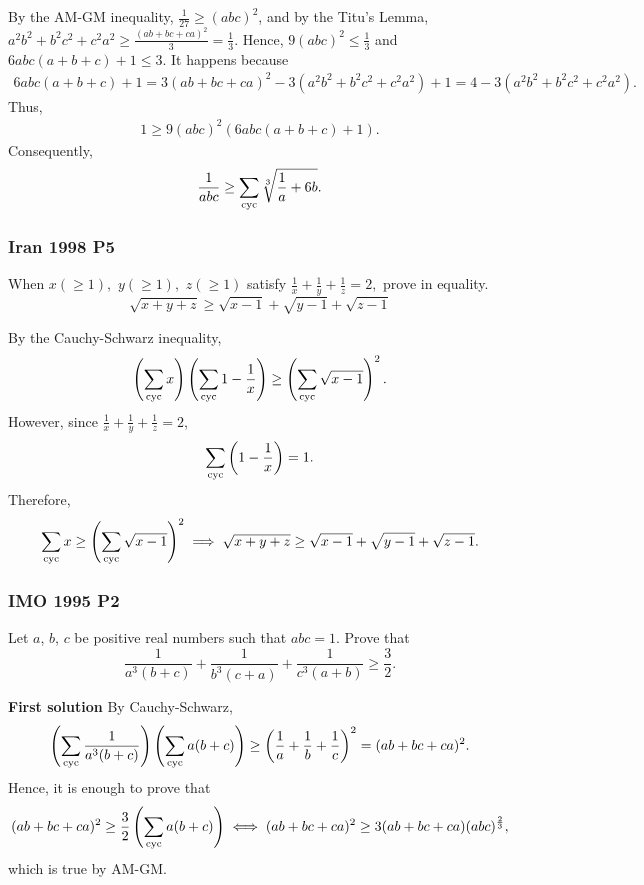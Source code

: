 \documentclass[12pt]{article}
\begin{document}
\clearpage

By the AM-GM inequality, $\frac{1}{27} \ge (abc)^2$, and by the Titu's Lemma, $a^2b^2+b^2c^2+c^2a^2 \ge \frac{(ab+bc+ca)^2}{3} = \frac{1}{3}$.
Hence, $9(abc)^2 \le \frac{1}{3}$ and $6abc(a+b+c)+1 \le 3$. It happens because
\begin{align*}
	6abc(a+b+c)+1 = 3(ab+bc+ca)^2 -3(a^2b^2+b^2c^2+c^2a^2)+1=4-3(a^2b^2+b^2c^2+c^2a^2).
\end{align*}
Thus,
\begin{align*}
	1 \ge 9(abc)^2(6abc(a+b+c)+1).
\end{align*}
Consequently,
\begin{align*}
	\frac{1}{abc} \ge \sum_{\text{cyc}} \sqrt[3]{\frac{1}{a} +6b}.
\end{align*}

\clearpage

\subsubsection{Iran 1998 P5}

\begin{problem}
When $x(\ge1),$ $y(\ge1),$ $z(\ge1)$ satisfy $\frac{1}{x}+\frac{1}{y}+\frac{1}{z}=2,$ prove in equality.
$$\sqrt{x+y+z}\ge\sqrt{x-1}+\sqrt{y-1}+\sqrt{z-1}$$
\end{problem}

By the Cauchy-Schwarz inequality,
\[
	\left(\sum_{\text{cyc}} x\right)\left(\sum_{\text{cyc}} 1-\frac{1}{x}\right) \ge \left(\sum_{\text{cyc}} \sqrt{x-1}\right)^2.
\]
However, since $\frac{1}{x}+\frac{1}{y}+\frac{1}{z}=2$,
\[
	\sum_{\text{cyc}} \left(1-\frac{1}{x}\right) = 1.
\]
Therefore,
\[
	\sum_{\text{cyc}} x \ge \left(\sum_{\text{cyc}} \sqrt{x-1}\right)^2 \implies
	\sqrt{x+y+z}\ge\sqrt{x-1}+\sqrt{y-1}+\sqrt{z-1}.
\]

\clearpage

\subsubsection{IMO 1995 P2}

\begin{problem}
Let $ a$, $ b$, $ c$ be positive real numbers such that $ abc = 1$. Prove that
\[
	\frac {1}{a^{3}\left(b + c\right)} + \frac {1}{b^{3}\left(c + a\right)} + \frac {1}{c^{3}\left(a + b\right)}\geq \frac {3}{2}.
\]
\end{problem}

\textcolor{color1}{\textbf{First solution}} By Cauchy-Schwarz,
\[
	\left(\sum_{\text{cyc}} \frac{1}{a^3(b+c)}\right)\left(\sum_{\text{cyc}} a(b+c)\right) \geq
	\left(\frac{1}{a} + \frac{1}{b} + \frac{1}{c}\right)^2 = (ab+bc+ca)^2.
\]
Hence, it is enough to prove that
\[
	(ab+bc+ca)^2 \geq \frac{3}{2}\left(\sum_{\text{cyc}} a(b+c)\right) \iff (ab+bc+ca)^2 \geq 3(ab+bc+ca)(abc)^{\frac{2}{3}},
\]
which is true by AM-GM.
\end{document}
